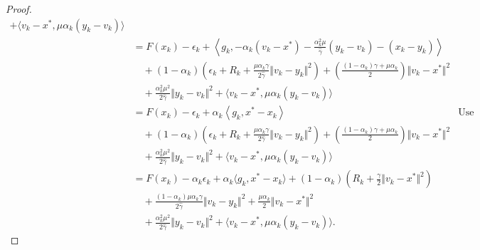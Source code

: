 \documentclass[12pt]{article}
\begin{document}
\begin{proof}
\begin{align*}
                + \langle v_k - x^*, \mu\alpha_k(y_k - v_k)\rangle
            \\
            &= 
            F(x_k) - \epsilon_k 
            + \left\langle 
                g_k, 
                - \alpha_k(v_k - x^*) 
                - \frac{\alpha_k^2\mu}{\hat \gamma}(y_k - v_k)
                - (x_k - y_k)
            \right\rangle
            \\
            &\quad 
                + (1 - \alpha_k)
                \left(
                    \epsilon_k + R_k + 
                    \frac{\mu\alpha_k\gamma}{2\hat \gamma}
                    \Vert v_k - y_k\Vert^2
                \right)
                + 
                \left(
                \frac{(1 - \alpha_k)\gamma + \mu \alpha_k}{2} 
                \right)\Vert v_k - x^*\Vert^2
            \\
            & \quad 
                + \frac{\alpha_k^2 \mu^2}{2\hat \gamma}\Vert y_k - v_k\Vert^2
                + \langle v_k - x^*, \mu\alpha_k(y_k - v_k)\rangle
            \\
            &= 
            F(x_k) - \epsilon_k 
            + \alpha_k\left\langle 
                g_k, 
                x^* - x_k
            \right\rangle
            & \text{Use Q3}
            \\
            &\quad 
                + (1 - \alpha_k)
                \left(
                    \epsilon_k + R_k + 
                    \frac{\mu\alpha_k\gamma}{2\hat \gamma}
                    \Vert v_k - y_k\Vert^2
                \right)
                + 
                \left(
                \frac{(1 - \alpha_k)\gamma + \mu \alpha_k}{2} 
                \right)\Vert v_k - x^*\Vert^2
            \\
            & \quad 
                + \frac{\alpha_k^2 \mu^2}{2\hat \gamma}\Vert y_k - v_k\Vert^2
                + \langle v_k - x^*, \mu\alpha_k(y_k - v_k)\rangle
            \\
            &= 
            F(x_k) - \alpha_k\epsilon_k + \alpha_k\langle g_k, x^* - x_k\rangle
            + 
            (1 - \alpha_k)\left(
                R_k + \frac{\gamma}{2}\Vert v_k - x^*\Vert^2
            \right)
            \\&\quad 
                + \frac{(1 - \alpha_k)\mu\alpha_k\gamma}{2\hat \gamma}\Vert v_k - y_k\Vert^2
                + \frac{\mu \alpha_k}{2}\Vert v_k - x^*\Vert^2
            \\&\quad 
                + \frac{\alpha_k^2 \mu^2}{2\hat\gamma}\Vert y_k - v_k\Vert^2
                + \langle v_k - x^*, \mu\alpha_k(y_k - v_k)\rangle. 

\end{align*}
\end{proof}
\end{document}
